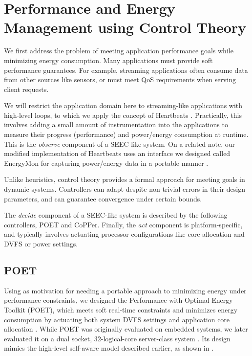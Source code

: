 \section{Performance and Energy Management using Control Theory}

We first address the problem of meeting application performance goals while minimizing energy consumption.
Many applications must provide soft performance guarantees.
For example, streaming applications often consume data from other sources like sensors, or must meet QoS requirements when serving client requests.

We will restrict the application domain here to streaming-like applications with high-level loops, to which we apply the concept of Heartbeats \cite{icac2010heartbeats}.
Practically, this involves adding a small amount of instrumentation into the applications to measure their progress (performance) and power/energy consumption at runtime.
This is the \emph{observe} component of a SEEC-like system.
On a related note, our modified implementation of Heartbeats uses an interface we designed called EnergyMon for capturing power/energy data in a portable manner \cite{energymon}.

Unlike heuristics, control theory provides a formal approach for meeting goals in dynamic systems.
Controllers can adapt despite non-trivial errors in their design parameters, and can guarantee convergence under certain bounds.

The \emph{decide} component of a SEEC-like system is described by the following controllers, POET and CoPPer.
Finally, the \emph{act} component is platform-specific, and typically involves actuating processor configurations like core allocation and DVFS or power settings.


\subsection{POET}

Using \cite{Imes2014} as motivation for needing a portable approach to minimizing energy under performance constraints, we designed the Performance with Optimal Energy Toolkit (POET), which meets soft real-time constraints and minimizes energy consumption by actuating both system DVFS settings and application core allocation \cite{POET}.
While POET was originally evaluated on embedded systems, we later evaluated it on a dual socket, 32-logical-core server-class system \cite{POETMCSoC}.
Its design mimics the high-level self-aware model described earlier, as shown in .


